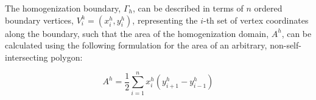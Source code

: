 

The homogenization boundary, $\Gamma_{h}$, can be described in terms of $n$ ordered boundary vertices, $V_{i}^{h}=(x_{i}^{h},y_{i}^{h})$, representing the $i$-th set of vertex coordinates along the boundary, such that the area of the homogenization domain, $A^{h}$, can be calculated using the following formulation for the area of an arbitrary, non-self-intersecting polygon\citep{Zwillinger_1995}: 

\begin{equation}
A^{h}=\dfrac{1}{2}\sum_{i=1}^{n}x_{i}^{h}(y_{i+1}^{h}-y_{i-1}^{h})
\label{eqn:hom1}
\end{equation}





